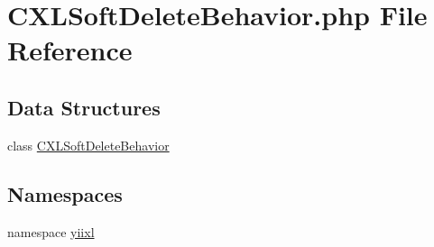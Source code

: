 \hypertarget{CXLSoftDeleteBehavior_8php}{
\section{CXLSoftDeleteBehavior.php File Reference}
\label{CXLSoftDeleteBehavior_8php}
}
\subsection*{Data Structures}
\begin{DoxyCompactItemize}
\item 
class \hyperlink{classCXLSoftDeleteBehavior}{CXLSoftDeleteBehavior}
\end{DoxyCompactItemize}
\subsection*{Namespaces}
\begin{DoxyCompactItemize}
\item 
namespace \hyperlink{namespaceyiixl}{yiixl}
\end{DoxyCompactItemize}
